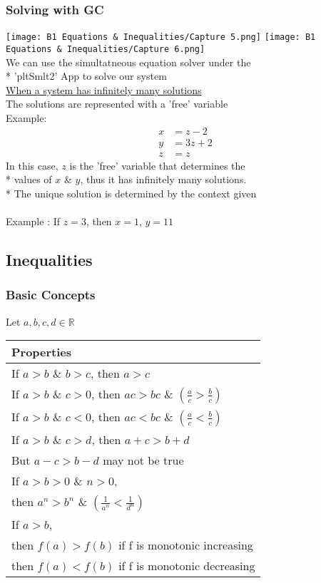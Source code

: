 \documentclass[../main.tex]{subfiles}
\begin{document}
\subsubsection{Solving with GC}
\texttt{[image: B1 Equations \& Inequalities/Capture 5.png]}
\texttt{[image: B1 Equations \& Inequalities/Capture 6.png]} \\
We can use the simultatneous equation solver under the \\*
'pltSmlt2' App to solve our system \\
\underline{When a system has infinitely many solutions} \\
The solutions are represented with a 'free' variable \\
Example:
\begin{align*}
    x &= z - 2 \\
    y &= 3z + 2 \\
    z &= z
\end{align*}
In this case, \(z\) is the 'free' variable that determines the \\*
values of \(x\) \& \(y\), thus it has infinitely many solutions. \\*
The unique solution is determined by the context given \\\\
Example : If \(z=3\), then \(x=1\), \(y=11\)

\subsection{Inequalities}
\subsubsection{Basic Concepts}
Let \(a,b,c,d \in \mathbb{R}\) \\
\begin{tabularx}{0.43\textwidth} {
    | >{\centering\arraybackslash}X |}
    \hline
    \textbf{Properties} \\
    \hline
    If \(a>b\) \& \(b>c\), then \(a>c\) \\
    \hline
    If \(a>b\) \& \(c>0\), then \(ac>bc\) \& \(\displaystyle \left(\frac{a}{c}>\frac{b}{c}\right)\) \\
    \hline
    If \(a>b\) \& \(c<0\), then \(ac<bc\) \& \(\displaystyle \left(\frac{a}{c}<\frac{b}{c}\right)\) \\
    \hline
    If \(a>b\) \& \(c>d\), then \(a+c>b+d\) \\
    But \(a-c>b-d\) may not be true \\
    \hline
    If \(a>b>0\) \& \(n>0\), \\
    then \(a^n>b^n\) \& \(\displaystyle \left(\frac{1}{a^n}<\frac{1}{d^n}\right)\) \\
    \hline
    If \(a>b\),  \\
    then \(f(a)>f(b)\) if f is monotonic increasing \\
    then \(f(a)<f(b)\) if f is monotonic decreasing \\
    \hline
\end{tabularx}
\newpage \noindent
\end{document}
